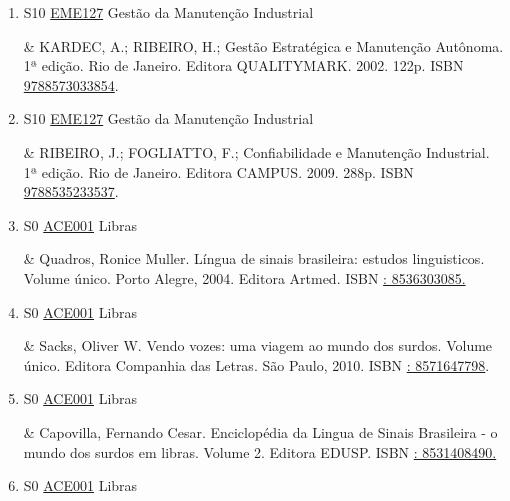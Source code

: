 \documentclass[12pt,a4paper]{book}
\begin{document}
\begin{enumerate}
& BRANCO FILHO, G.;  Custos de Manutenção.  1ª edição.  Rio de Janeiro.  Editora CIÊNCIA MODERNA LTDA.  2010.  146p.  ISBN \href{http://www.bn.br/site/pages/servicosProfissionais/agenciaISBN/isbnBusca/FbnBuscaISBNCatalogo.asp?pField=ISBN&pIntPagina=1&pISBN=73939644&nidbISBN=true&hidbISBN=true}{9788573939644}. 
 

 \item S10 \hyperref[PUD:EME127]{EME127} Gestão da Manutenção Industrial

& KARDEC, A.;  RIBEIRO, H.;  Gestão Estratégica e Manutenção Autônoma.  1ª edição.  Rio de Janeiro.  Editora QUALITYMARK.  2002.  122p.  ISBN \href{http://www.bn.br/site/pages/servicosProfissionais/agenciaISBN/isbnBusca/FbnBuscaISBNCatalogo.asp?pField=ISBN&pIntPagina=1&pISBN=73033854&nidbISBN=true&hidbISBN=true}{9788573033854}. 
 

 \item S10 \hyperref[PUD:EME127]{EME127} Gestão da Manutenção Industrial

&  RIBEIRO, J.;  FOGLIATTO, F.;  Confiabilidade e Manutenção Industrial.  1ª edição.  Rio de Janeiro.  Editora CAMPUS.  2009.  288p.  ISBN \href{http://www.bn.br/site/pages/servicosProfissionais/agenciaISBN/isbnBusca/FbnBuscaISBNCatalogo.asp?pField=ISBN&pIntPagina=1&pISBN=35233537&nidbISBN=true&hidbISBN=true}{9788535233537}.
 \item S0 \hyperref[PUD:ACE001]{ACE001} Libras

&  Quadros, Ronice Muller.  Língua de sinais brasileira: estudos linguisticos.  Volume único.  Porto Alegre, 2004.  Editora Artmed.  ISBN \href{http://www.google.com/search?hl=pt-BR&tbo=p&tbm=bks&q=isbn:: 8536303085.&num=10}{: 8536303085.} 

 

 \item S0 \hyperref[PUD:ACE001]{ACE001} Libras

&  Sacks, Oliver W.  Vendo vozes: uma viagem ao mundo dos surdos.  Volume único.  Editora Companhia das Letras.  São Paulo, 2010.  ISBN \href{http://www.google.com/search?hl=pt-BR&tbo=p&tbm=bks&q=isbn:: 
8571647798&num=10}{: 
8571647798}.  

 

 \item S0 \hyperref[PUD:ACE001]{ACE001} Libras

&   Capovilla, Fernando Cesar.  Enciclopédia da Lingua de Sinais Brasileira - o mundo dos surdos em libras.  Volume 2.  Editora EDUSP.  ISBN \href{http://www.google.com/search?hl=pt-BR&tbo=p&tbm=bks&q=isbn:: 8531408490.&num=10}{: 8531408490.}
 \item S0 \hyperref[PUD:ACE001]{ACE001} Libras


\end{enumerate}
\end{document}
